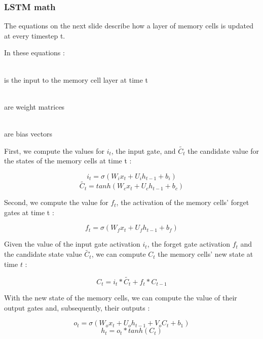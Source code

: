 \documentclass[utf8x,xcolor=pdftex,dvipsnames,table]{beamer}
\begin{document}
\begin{frame}[allowframebreaks]
  \frametitle{LSTM math}
The equations on the next slide describe how a layer of memory cells is updated at every timestep t.

In these equations :

\begin{description}[m]
\item[$x_t$] \hfill \\
is the input to the memory cell layer at time t
\item[$W_i$, $W_f$, $W_c$, $W_o$, $U_i$, $U_f$, $U_c$, $U_o$ and $V_o$] \hfill \\
 are weight matrices
\item[$b_i$, $b_f$, $b_c$ and $b_o$] \hfill \\
are bias vectors
\end{description}

\framebreak

First, we compute the values for $i_t$, the input gate, and $\widetilde{C_t}$ the candidate value for the states of the memory cells at time t :

\begin{equation}
i_t = \sigma(W_i x_t + U_i h_{t-1} + b_i)
\end{equation}
\begin{equation}
\widetilde{C_t} = tanh(W_c x_t + U_c h_{t-1} + b_c)
\end{equation}

Second, we compute the value for $f_t$, the activation of the memory cells’ forget gates at time t :

\begin{equation}
f_t = \sigma(W_f x_t + U_f h_{t-1} + b_f)
\end{equation}

\framebreak

Given the value of the input gate activation $i_t$, the forget gate activation $f_t$ and the candidate state value $\widetilde{C_t}$, we can compute $C_t$ the memory cells’ new state at time $t$ :

\begin{equation}
C_t = i_t * \widetilde{C_t} + f_t * C_{t-1}
\end{equation}

With the new state of the memory cells, we can compute the value of their output gates and, subsequently, their outputs :

\begin{equation}
o_t = \sigma(W_o x_t + U_o h_{t-1} + V_o C_t + b_1)
\end{equation}
\begin{equation}
h_t = o_t * tanh(C_t)
\end{equation}

\end{frame}
\end{document}
